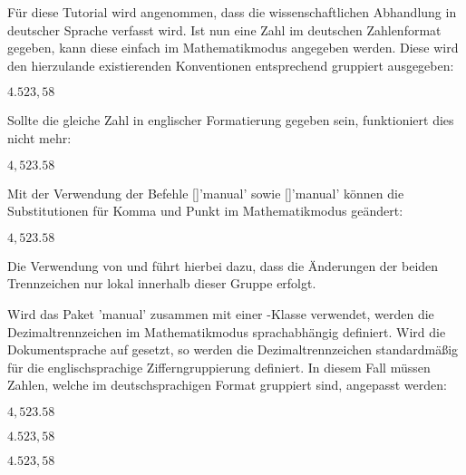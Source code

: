 \documentclass[english,ngerman]{tudscrartcl}
\begin{document}
\begin{Bundle}{}
Für diese Tutorial wird angenommen, dass die wissenschaftlichen Abhandlung in 
deutscher Sprache verfasst wird. Ist nun eine Zahl im deutschen Zahlenformat 
gegeben, kann diese einfach im Mathematikmodus angegeben werden. Diese wird 
den hierzulande existierenden Konventionen entsprechend gruppiert ausgegeben:
%
\begin{Trunk*}
\(4.523,58\)

\end{Trunk*}
%
Sollte die gleiche Zahl in englischer Formatierung gegeben sein, funktioniert 
dies nicht mehr:
%
\begin{Trunk*}
\(4,523.58\)

\end{Trunk*}
%
Mit der Verwendung der Befehle [\PParameter{\bsc,}]'manual'
sowie [\PParameter{,}]'manual' können die Substitutionen für 
Komma und Punkt im Mathematikmodus geändert:
%
\begin{Trunk*}
\begingroup
  \commaswap{\,}
  \dotswap{,}
  \(4,523.58\)
\endgroup

\end{Trunk*}
%
Die Verwendung von  und  führt hierbei 
dazu, dass die Änderungen der beiden Trennzeichen nur lokal innerhalb dieser 
Gruppe erfolgt.

Wird das Paket 'manual' zusammen mit einer \TUDScript-Klasse 
verwendet, werden die Dezimaltrennzeichen im Mathematikmodus sprachabhängig 
definiert. Wird die Dokumentsprache auf  gesetzt, so werden die
Dezimaltrennzeichen standardmäßig für die englischsprachige Zifferngruppierung 
definiert. In diesem Fall müssen Zahlen, welche im deutschsprachigen Format 
gruppiert sind, angepasst werden:
%
\begin{Trunk*}
\begingroup%
  \(4,523.58\)\par
  \(4.523,58\)\par
  \dotswap{\,}
  \(4.523,58\)%
\endgroup
\end{Trunk*}
%
\FinishTutorial
\ListOfToDo
\end{Bundle}
\end{document}
